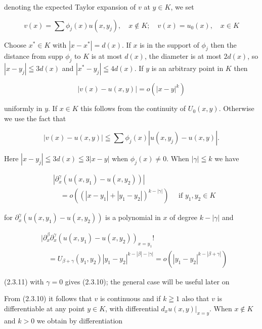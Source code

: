 denoting the expected Taylor expansion of $v$ at $y \in K$, we set

\[
v(x)=\sum \phi_{j}(x) u\left(x, y_{j}\right), \quad x \notin K ; \quad v(x)=u_{0}(x), \quad x \in K
\]

Choose $x^{*} \in K$ with $\left|x-x^{*}\right|=d(x)$. If $x$ is in the support of $\phi_{j}$ then the distance from supp $\phi_{j}$ to $K$ is at most $d(x)$, the diameter is at most $2 d(x)$, so $\left|x-y_{j}\right| \leqq 3 d(x)$ and $\left|x^{*}-y_{j}\right| \leqq 4 d(x)$. If $y$ is an arbitrary point in $K$ then


\begin{equation*}
|v(x)-u(x, y)|=o\left(|x-y|^{k}\right) \tag{2.3.10}
\end{equation*}


uniformly in $y$. If $x \in K$ this follows from the continuity of $U_{0}(x, y)$. Otherwise we use the fact that

\[
|v(x)-u(x, y)| \leqq \sum \phi_{j}(x)\left|u\left(x, y_{j}\right)-u(x, y)\right| .
\]

Here $\left|x-y_{j}\right| \leqq 3 d(x) \leqq 3|x-y|$ when $\phi_{j}(x) \neq 0$. When $|\gamma| \leqq k$ we have


\begin{align*}
& \left|\partial_{x}^{\gamma}\left(u\left(x, y_{1}\right)-u\left(x, y_{2}\right)\right)\right|  \tag{2.3.11}\\
& \quad=o\left(\left(\left|x-y_{1}\right|+\left|y_{1}-y_{2}\right|\right)^{k-|\gamma|}\right) \quad \text { if } y_{1}, y_{2} \in K
\end{align*}


for $\partial_{x}^{\gamma}\left(u\left(x, y_{1}\right)-u\left(x, y_{2}\right)\right)$ is a polynomial in $x$ of degree $k-|\gamma|$ and

\[
\begin{aligned}
& \mid \partial_{x}^{\beta} \partial_{x}^{\gamma}\left(u\left(x, y_{1}\right)-u\left(x, y_{2}\right)\right)_{x=y_{1}} ! \\
& \quad=U_{\beta+\gamma}\left(y_{1}, y_{2}\right)\left|y_{1}-y_{2}\right|^{k-|\beta|-|\gamma|}=o\left(\left|y_{1}-y_{2}\right|^{k-|\beta+\gamma|}\right)
\end{aligned}
\]

(2.3.11) with $\gamma=0$ gives (2.3.10); the general case will be useful later on

From (2.3.10) it follows that $v$ is continuous and if $k \geqq 1$ also that $v$ is differentiable at any point $y \in K$, with differential $\left.d_{x} u(x, y)\right|_{x=y}$. When $x \notin K$ and $k>0$ we obtain by differentiation


